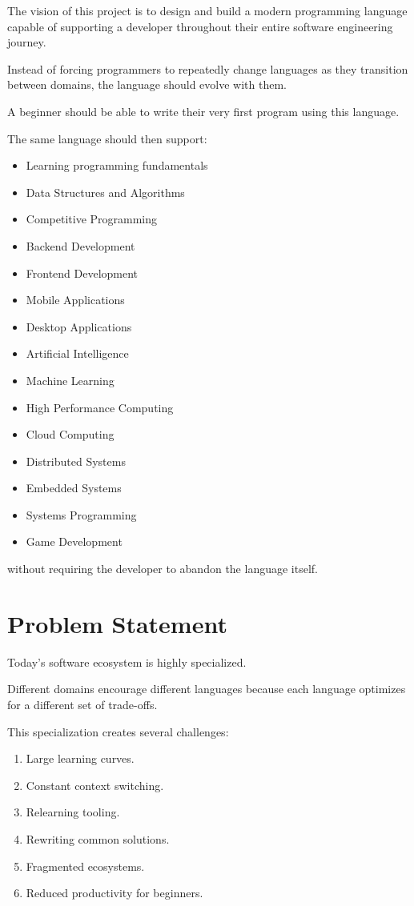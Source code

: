 \documentclass[12pt]{article}
\begin{document}
The vision of this project is to design and build a modern programming language capable of supporting a developer throughout their entire software engineering journey.

Instead of forcing programmers to repeatedly change languages as they transition between domains, the language should evolve with them.

A beginner should be able to write their very first program using this language.

The same language should then support:

\begin{itemize}
    \item Learning programming fundamentals
    \item Data Structures and Algorithms
    \item Competitive Programming
    \item Backend Development
    \item Frontend Development
    \item Mobile Applications
    \item Desktop Applications
    \item Artificial Intelligence
    \item Machine Learning
    \item High Performance Computing
    \item Cloud Computing
    \item Distributed Systems
    \item Embedded Systems
    \item Systems Programming
    \item Game Development
\end{itemize}

without requiring the developer to abandon the language itself.


\section{Problem Statement}

Today's software ecosystem is highly specialized.

Different domains encourage different languages because each language optimizes for a different set of trade-offs.

This specialization creates several challenges:

\begin{enumerate}
    \item Large learning curves.
    \item Constant context switching.
    \item Relearning tooling.
    \item Rewriting common solutions.
    \item Fragmented ecosystems.
    \item Reduced productivity for beginners.
\end{enumerate}
\end{document}
